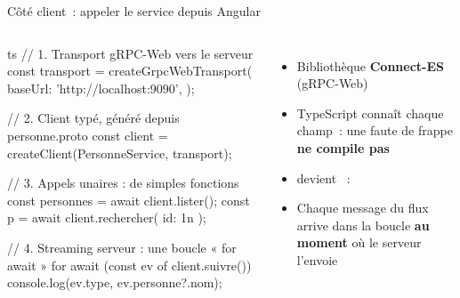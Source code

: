 \documentclass[aspectratio=169,11pt]{beamer}
\begin{document}
\begin{frame}[fragile]{Côté client~: appeler le service depuis Angular}
  \begin{columns}[T,onlytextwidth]
\begin{codetiny}{ts}
// 1. Transport gRPC-Web vers le serveur
const transport = createGrpcWebTransport({
  baseUrl: 'http://localhost:9090',
});

// 2. Client typé, généré depuis personne.proto
const client = createClient(PersonneService, transport);

// 3. Appels unaires : de simples fonctions
const { personnes } = await client.lister({});
const p = await client.rechercher({ id: 1n });

// 4. Streaming serveur : une boucle « for await »
for await (const ev of client.suivre({})) {
  console.log(ev.type, ev.personne?.nom);
}
\end{codetiny}
    \footnotesize
    \begin{itemize}
      \item Bibliothèque \textbf{Connect-ES} (gRPC-Web)
      \item TypeScript connaît chaque champ~: une faute de frappe \textbf{ne compile pas}
      \item {} devient ~: 
      \item Chaque message du flux arrive dans la boucle \textbf{au moment} où le serveur l'envoie
    \end{itemize}
  \end{columns}
\end{frame}
\end{document}
